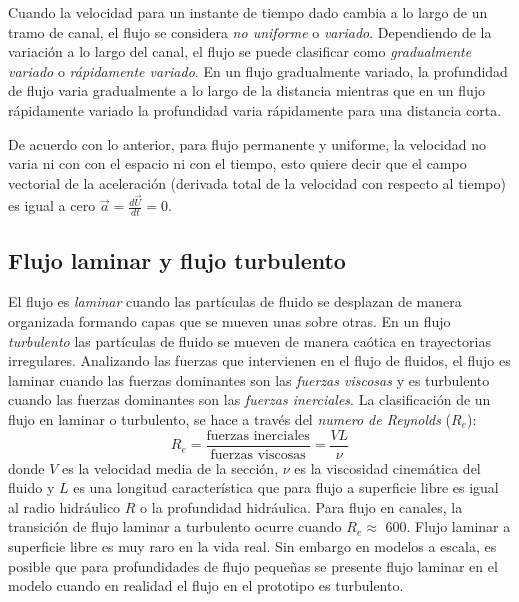 \documentclass[11pt, oneside]{article}
\begin{document}
Cuando la velocidad para un instante de tiempo dado cambia a lo largo de un tramo de canal, el flujo se considera \emph{no uniforme} o \emph{variado}. Dependiendo de la variación a lo largo del canal, el flujo se puede clasificar como \emph{gradualmente variado} o \emph{rápidamente variado}. En un flujo gradualmente variado, la profundidad de flujo varia gradualmente a lo largo de la distancia mientras que en un flujo rápidamente variado la profundidad varia rápidamente para una distancia corta.

De acuerdo con lo anterior, para flujo permanente y uniforme, la velocidad no varia ni con con el espacio ni con el tiempo, esto quiere decir que el campo vectorial de la aceleración (derivada total de la velocidad con respecto al tiempo) es igual a cero $\vec{a}=\frac{d \vec{U}}{d t} = 0$.

\subsection{Flujo laminar y flujo turbulento}
El flujo es \emph{laminar} cuando las partículas de fluido se desplazan de manera organizada formando capas que se mueven unas sobre otras. En un flujo \emph{turbulento} las partículas de fluido se mueven de manera ca\'otica en trayectorias irregulares. Analizando las fuerzas que intervienen en el flujo de fluidos, el flujo es laminar cuando las fuerzas dominantes son las \emph{fuerzas viscosas} y es turbulento cuando las fuerzas dominantes son las \emph{fuerzas inerciales}. La clasificaci\'on de un flujo en laminar o turbulento, se hace a trav\'es del \emph{numero de Reynolds} ($R_e$):
\begin{equation}
R_e = \frac{\text{fuerzas inerciales}}{\text{fuerzas viscosas}} = \frac{V L}{\nu}
\label{Re}
\end{equation}
donde $V$ es la velocidad media de la secci\'on, $\nu$ es la viscosidad cinem\'atica del fluido y $L$ es una longitud característica que para flujo a superficie libre es igual al radio hidráulico $R$ o la profundidad hidráulica. Para flujo en canales, la transición de flujo laminar a turbulento ocurre cuando $R_e \approx $ 600. Flujo laminar a superficie libre es muy raro en la vida real. Sin embargo en modelos a escala, es posible que para profundidades de flujo pequeñas  se presente flujo laminar en el modelo cuando en realidad el flujo en el prototipo es turbulento. 
\end{document}
